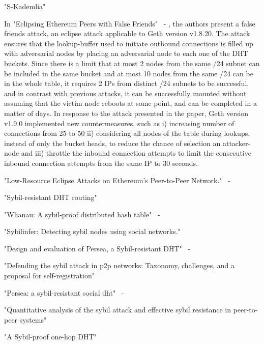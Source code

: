 "S-Kademlia"~\cite{pecori2016s}

In "Eclipsing Ethereum Peers with False Friends"~\cite{henningsen2019eclipsing} - ,  the authors present 
a false friends attack,  an eclipse attack applicable to Geth version v1.8.20.  The attack ensures that the lookup-buffer used to initiate outbound connections is filled up with adversarial nodes by placing an adversarial node to each one of the DHT buckets. 
Since there is a limit that at most 2 nodes from the same /24 subnet can be included in the same bucket and at most 10 nodes from the same /24 can be in the whole table,  it requires  2 IPs from distinct /24 subnets to be successful,  and in contrast
with previous attacks, it can be successfully mounted without
assuming that the victim node reboots at some point, and can be completed in a matter of days.
In response to the attack presented in the paper,  Geth version v1.9.0 implemented new countermeasures,  such as i) increasing number of connections from 25 to 50 ii) considering all nodes of the table during lookups, instead of only the bucket heads,  to reduce the chance
of selection an attacker-node and iii) throttle the inbound connection attempts to limit the consecutive inbound connection attempts from the same IP to 30 seconds.

"Low-Resource Eclipse Attacks on Ethereum's Peer-to-Peer Network."~\cite{marcus2018low} - 

"Sybil-resistant DHT routing"~\cite{danezis2005sybil}

"Whanau: A sybil-proof distributed hash table"~\cite{lesniewski2010whanau} - 

"Sybilinfer: Detecting sybil nodes using social networks."~\cite{danezis2009sybilinfer}

"Design and evaluation of Persea, a Sybil-resistant DHT"~\cite{al2014design} - 

"Defending the sybil attack in p2p networks: Taxonomy, challenges, and a proposal for self-registration"~\cite{dinger2006defending}

"Persea: a sybil-resistant social dht"~\cite{al2013persea} - 

"Quantitative analysis of the sybil attack and effective sybil resistance in peer-to-peer systems"~\cite{jetter2010quantitative}

"A Sybil-proof one-hop DHT"~\cite{lesniewski2008sybil}

